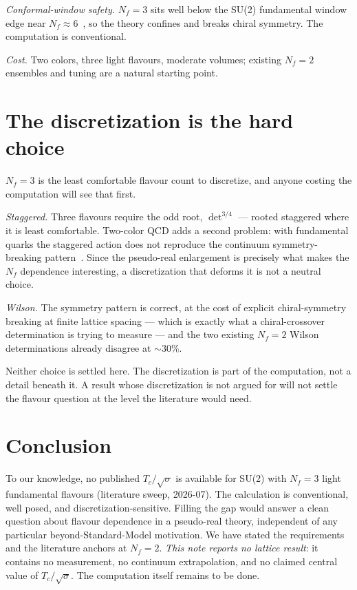 \documentclass[aps,prd,twocolumn,superscriptaddress,nofootinbib,10pt]{revtex4-2}
\begin{document}
\emph{Conformal-window safety.} $N_f=3$ sits well below the SU(2) fundamental window edge near
$N_f\approx 6$~\cite{Karavirta2012,Appelquist2016}, so the theory confines and breaks chiral symmetry.
The computation is conventional.

\emph{Cost.} Two colors, three light flavours, moderate volumes; existing $N_f=2$ ensembles and
tuning are a natural starting point.

\section{The discretization is the hard choice}

$N_f=3$ is the least comfortable flavour count to discretize, and anyone costing the computation will
see that first.

\emph{Staggered.} Three flavours require the odd root, $\det^{3/4}$ --- rooted staggered where it is
least comfortable. Two-color QCD adds a second problem: with fundamental quarks the staggered action
does not reproduce the continuum symmetry-breaking pattern~\cite{Astrakhantsev2019}. Since the
pseudo-real enlargement is precisely what makes the $N_f$ dependence interesting, a discretization
that deforms it is not a neutral choice.

\emph{Wilson.} The symmetry pattern is correct, at the cost of explicit chiral-symmetry breaking at
finite lattice spacing --- which is exactly what a chiral-crossover determination is trying to
measure --- and the two existing $N_f=2$ Wilson determinations already disagree at $\sim\!30\%$.

Neither choice is settled here. The discretization is part of the computation, not a detail beneath
it. A result whose discretization is not argued for will not settle the flavour question at the
level the literature would need.

\section{Conclusion}

To our knowledge, no published $T_c/\sqrt{\sigma}$ is available for SU(2) with $N_f=3$ light
fundamental flavours (literature sweep, 2026-07). The calculation is conventional, well posed, and
discretization-sensitive. Filling the gap would answer a clean question about flavour dependence
in a pseudo-real theory, independent of any particular beyond-Standard-Model motivation. We have
stated the requirements and the literature anchors at $N_f=2$. \emph{This note reports no lattice
result}: it contains no measurement, no continuum extrapolation, and no claimed central value of
$T_c/\sqrt{\sigma}$. The computation itself remains to be done.
\end{document}
